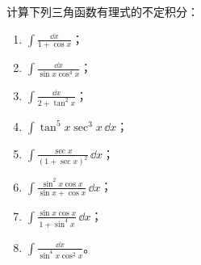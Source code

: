\begin{xexercise}[3]
计算下列三角函数有理式的不定积分：
  \begin{enumerate}[label=(\arabic*)]
    \item $\displaystyle\int\frac{\dd x}{1+\cos x}$；
    \item $\displaystyle\int\frac{\dd x}{\sin x\cos^4x}$；
    \item $\displaystyle\int\frac{\dd x}{2+\tan^2x}$；
    \item $\displaystyle\int\tan^5x\sec^3x\,\dd x$；
    \item $\displaystyle\int\frac{\sec x}{(1+\sec x)^2}\,\dd x$；
    \item $\displaystyle\int\frac{\sin^2x\cos x}{\sin x+\cos x}\,\dd x$；
    \item $\displaystyle\int\frac{\sin x\cos x}{1+\sin^4x}\,\dd x$；
    \item $\displaystyle\int\frac{\dd x}{\sin^4x\cos^2x}$。
  \end{enumerate}
\end{xexercise}
